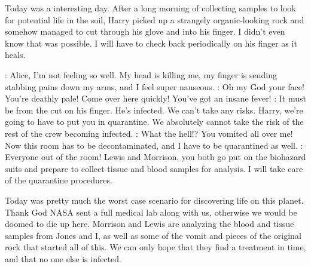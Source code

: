 \documentclass[main.tex]{subfiles}
\begin{document}
	Today was a interesting day.  After a long morning of collecting samples to look for
	potential life in the soil, Harry picked up a strangely organic-looking rock and somehow managed to cut
	through his glove and into his finger.  I didn't even know that was possible.  I will have to check back periodically on his
	finger as it heals.  
	\begin{drama}
		
		
		\jonesspeaks:		Alice, I'm not feeling so well.  My head is killing me, my finger is sending stabbing pains
		down my arms, and I feel super nauseous.
		\lewisspeaks:		Oh my God your face!  You're deathly pale!  Come over here quickly!  You've got an insane
		fever!  
		\ramseyspeaks:		It must be from the cut on his finger.  He's infected.  We can't take any risks.  Harry,
		we're going to have to put you in quarantine.  We absolutely cannot take the risk of the rest of the crew
		becoming infected. 
		\ramseyspeaks:		What the hell!?  You vomited all over me!  Now this room has to be decontaminated, and I
		have to be quarantined as well.  
		\ramseyspeaks:		Everyone out of the room!  Lewis and Morrison, you both go put on the biohazard suits and
		prepare to collect tissue and blood samples for analysis.  I will take care of the quarantine procedures.  
		
	\end{drama}
	
	Today was pretty much the worst case scenario for discovering life on this planet.  Thank God NASA sent a
	full medical lab along with us, otherwise we would be doomed to die up here.  Morrison and Lewis are
	analyzing the blood and tissue samples from Jones and I, as well as some of the vomit and pieces of the
	original rock that started all of this.  We can only hope that they find a treatment in time, and that no one
	else is infected.  
	
	\begin{drama}
		\Scene{Morrison Personal Log Sol 28}
		
	\end{drama}
	
\end{document}
